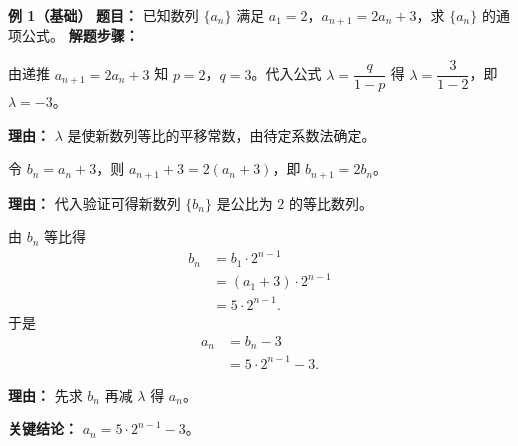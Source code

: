 \begin{examplebox}
	\textbf{\textcolor{CExample}{例 1（基础）}}
	\textbf{\textcolor{CExample}{题目：}}
	已知数列 $\{a_n\}$ 满足 $a_1=2$，$a_{n+1}=2a_n+3$，求 $\{a_n\}$ 的通项公式。
	\textbf{\textcolor{CExample}{解题步骤：}}
	\begin{description}[style=nextline,leftmargin=2.8em,labelsep=0.5em,itemsep=0.45em]
		\item[\textbf{第一步（确定$\lambda$值）：}]
			由递推 $a_{n+1}=2a_n+3$ 知 $p=2$，$q=3$。代入公式 $\lambda=\dfrac{q}{1-p}$ 得 $\lambda=\dfrac{3}{1-2}$，即 $\lambda=-3$。
			\par\textbf{理由：} $\lambda$ 是使新数列等比的平移常数，由待定系数法确定。
		\item[\textbf{第二步（构造新数列）：}]
			令 $b_n=a_n+3$，则 $a_{n+1}+3=2(a_n+3)$，即 $b_{n+1}=2b_n$。
			\par\textbf{理由：} 代入验证可得新数列 $\{b_n\}$ 是公比为 $2$ 的等比数列。
		\item[\textbf{第三步（回代求通项）：}]
			由 $b_n$ 等比得
			\[
				\begin{aligned}
					b_n &= b_1\cdot2^{n-1} \\ &= (a_1+3)\cdot2^{n-1} \\ &= 5\cdot2^{n-1}.
			\end{aligned}
			\]
			于是
			\[
				\begin{aligned}
					a_n &= b_n-3 \\ &= 5\cdot2^{n-1}-3.
			\end{aligned}
			\]
			\par\textbf{理由：} 先求 $b_n$ 再减 $\lambda$ 得 $a_n$。
	\end{description}
	\textbf{\textcolor{CExample}{关键结论：}}
	\textbf{$a_n=5\cdot2^{n-1}-3$}。


\end{examplebox}
